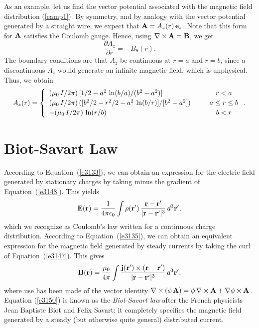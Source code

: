 As an example, let us find the vector potential associated with the magnetic field
distribution (\ref{eamp1}). By symmetry, and by analogy with the
vector potential generated by a straight wire, we expect that
${\bf A} = A_z(r)\,{\bf e}_z$. Note that this form for ${\bf A}$
satisfies the Coulomb gauge.
Hence, using $\nabla\times {\bf A} = {\bf B}$,  we get
\begin{equation}
\frac{\partial A_z}{\partial r} =- B_\theta(r).
\end{equation}
The boundary conditions are that $A_z$ be continuous at $r=a$ and $r=b$,
since a discontinuous $A_z$ would generate an infinite magnetic field,
which is unphysical. Thus, we obtain
\begin{equation}
A_z(r) = \left\{ 
\begin{array}{lcc}
(\mu_0\,I/2\pi)\,[1/2- a^2\,\ln(b/a)/(b^2-a^2)]&\mbox{\hspace{0.25cm}}&r<a\\[0.5ex]
(\mu_0\,I/2\pi)\,([b^2/2-r^2/2-a^2\,\ln(b/r)]/[b^2-a^2])&&a\leq r\leq b\\[0.5ex]
-(\mu_0\,I/2\pi)\,\ln(r/b)&&b<r
\end{array}
\right..
\end{equation}

\section{Biot-Savart Law}
According to Equation~(\ref{e3133}), we can obtain an expression for the electric field 
generated by stationary charges by
taking minus the gradient of Equation~(\ref{e3148}). This yields
\begin{equation}
{\bf E} ({\bf r}) = \frac{1}{4\pi\epsilon_0} \int\rho({\bf r}')\,
\frac{{\bf r} - {\bf r}'}{|{\bf r} - {\bf r}'|^3}\,d^3{\bf r}',
\end{equation}
which we recognize as Coulomb's law written for a continuous charge distribution. 
According to Equation~(\ref{e3135}), we can obtain an  equivalent expression for the magnetic 
field generated by steady currents by taking the curl of Equation~(\ref{e3147}). This gives
\begin{equation}
{\bf B} ({\bf r}) = \frac{\mu_0}{4\pi} \int
\frac{{\bf j}({\bf r}')\times
({\bf r} - {\bf r}')}{|{\bf r} - {\bf r}'|^3}\,d^3{\bf r}',\label{e3150}
\end{equation}
where use has been made of the vector identity $\nabla\times(\phi\,{\bf A})= 
\phi\,\nabla\times{\bf A} + \nabla\phi\times{\bf A}$. Equation (\ref{e3150}) is
known as the {\em Biot-Savart law}\/ after the French physicists Jean Baptiste
Biot and Felix Savart: it completely specifies the magnetic field generated 
by a steady (but otherwise quite general) distributed  current.

